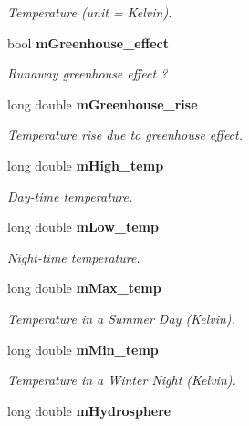 \begin{CompactItemize}
\begin{CompactList}\small\item\em Temperature (unit = Kelvin). \item\end{CompactList}\item 
bool {\bf m\-Greenhouse\_\-effect}\label{class_s_g___planet_p29}

\begin{CompactList}\small\item\em Runaway greenhouse effect ? \item\end{CompactList}\item 
long double {\bf m\-Greenhouse\_\-rise}\label{class_s_g___planet_p30}

\begin{CompactList}\small\item\em Temperature rise due to greenhouse effect. \item\end{CompactList}\item 
long double {\bf m\-High\_\-temp}\label{class_s_g___planet_p31}

\begin{CompactList}\small\item\em Day-time temperature. \item\end{CompactList}\item 
long double {\bf m\-Low\_\-temp}\label{class_s_g___planet_p32}

\begin{CompactList}\small\item\em Night-time temperature. \item\end{CompactList}\item 
long double {\bf m\-Max\_\-temp}\label{class_s_g___planet_p33}

\begin{CompactList}\small\item\em Temperature in a Summer Day (Kelvin). \item\end{CompactList}\item 
long double {\bf m\-Min\_\-temp}\label{class_s_g___planet_p34}

\begin{CompactList}\small\item\em Temperature in a Winter Night (Kelvin). \item\end{CompactList}\item 
long double {\bf m\-Hydrosphere}\label{class_s_g___planet_p35}


\end{CompactItemize}
